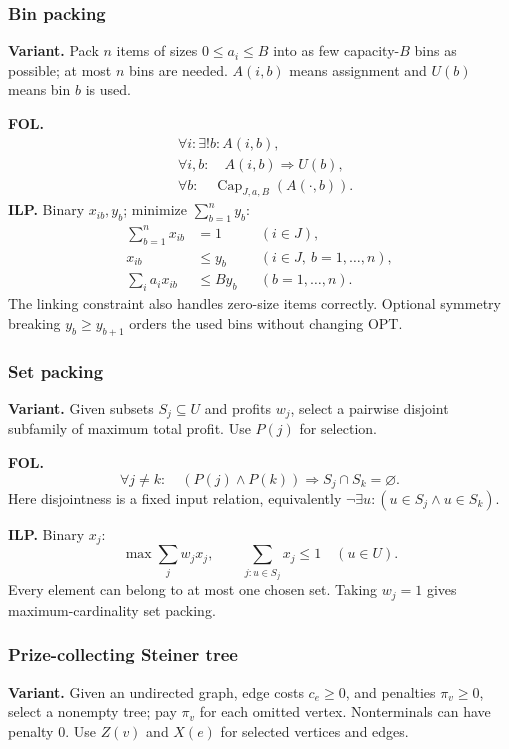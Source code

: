 \subsubsection{Bin packing}\label{form:bin}
\textbf{Variant.} Pack $n$ items of sizes $0\le a_i\le B$ into as few
capacity-$B$ bins as possible; at most $n$ bins are needed. $A(i,b)$ means
assignment and $U(b)$ means bin $b$ is used.

\textbf{FOL.}
\[
\begin{aligned}
 &\forall i:\exists!b:A(i,b),\\
 &\forall i,b:\quad A(i,b)\Rightarrow U(b),\\
 &\forall b:\quad\operatorname{Cap}_{J,a,B}(A(\cdot,b)).
\end{aligned}
\]
\textbf{ILP.} Binary $x_{ib},y_b$; minimize $\sum_{b=1}^n y_b$:
\[
\begin{aligned}
 \sum_{b=1}^n x_{ib}&=1 &&(i\in J),\\
 x_{ib}&\le y_b &&(i\in J,\ b=1,\ldots,n),\\
 \sum_i a_ix_{ib}&\le By_b &&(b=1,\ldots,n).
\end{aligned}
\]
The linking constraint also handles zero-size items correctly. Optional
symmetry breaking $y_b\ge y_{b+1}$ orders the used bins without changing OPT.

\subsubsection{Set packing}\label{form:setpack}
\textbf{Variant.} Given subsets $S_j\subseteq U$ and profits $w_j$, select
a pairwise disjoint subfamily of maximum total profit. Use $P(j)$ for selection.

\textbf{FOL.}
\[
 \forall j\ne k:\quad
 (P(j)\land P(k))\Rightarrow S_j\cap S_k=\varnothing.
\]
Here disjointness is a fixed input relation, equivalently
$\neg\exists u:(u\in S_j\land u\in S_k)$.

\textbf{ILP.} Binary $x_j$:
\[
 \max\sum_j w_jx_j,\qquad
 \sum_{j:u\in S_j}x_j\le1\quad(u\in U).
\]
Every element can belong to at most one chosen set. Taking $w_j=1$ gives
maximum-cardinality set packing.

\subsubsection{Prize-collecting Steiner tree}\label{form:pcst}
\textbf{Variant.} Given an undirected graph, edge costs $c_e\ge0$, and
penalties $\pi_v\ge0$, select a nonempty tree; pay $\pi_v$ for each omitted
vertex. Nonterminals can have penalty 0. Use $Z(v)$ and $X(e)$ for selected
vertices and edges.

